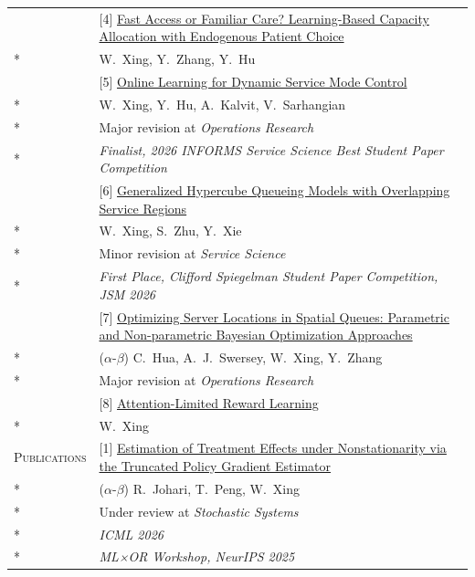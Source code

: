 \documentclass[letterpaper, 10pt]{article}
\newcommand{\cvsection}[1]{\nohyphens{\scshape #1}}
\newlength{\entrysep}   \setlength{\entrysep}{5pt}
\newlength{\sectionsep} \setlength{\sectionsep}{12pt}
\begin{document}
\begin{longtable}{p{}p{5.8in}}
& [4] \href{https://papers.ssrn.com/sol3/papers.cfm?abstract_id=7246479}{Fast Access or Familiar Care? Learning-Based Capacity Allocation with Endogenous Patient Choice} \\*
& W.~Xing, Y.~Zhang, Y.~Hu \\[\entrysep]

& [5] \href{https://papers.ssrn.com/sol3/papers.cfm?abstract_id=5123355}{Online Learning for Dynamic Service Mode Control} \\*
& W.~Xing, Y.~Hu, A.~Kalvit, V.~Sarhangian \\*
& Major revision at \textit{Operations Research} \\*
& \textit{Finalist, 2026 INFORMS Service Science Best Student Paper Competition} \\[\entrysep]

& [6] \href{https://arxiv.org/abs/2304.02824}{Generalized Hypercube Queueing Models with Overlapping Service Regions} \\*
& W.~Xing, S.~Zhu, Y.~Xie \\*
& Minor revision at \textit{Service Science} \\*
& \textit{First Place, Clifford Spiegelman Student Paper Competition, JSM 2026} \\[\entrysep]

& [7] \href{https://arxiv.org/abs/2505.22249}{Optimizing Server Locations in Spatial Queues: Parametric and Non-parametric Bayesian Optimization Approaches} \\*
& ($\alpha$-$\beta$) C.~Hua, A.~J.~Swersey, W.~Xing, Y.~Zhang \\*
& Major revision at \textit{Operations Research} \\[\entrysep]

& [8] \href{https://arxiv.org/abs/2607.04590}{Attention-Limited Reward Learning} \\*
& W.~Xing \\[\sectionsep]


\cvsection{Publications}
& [1] \href{https://arxiv.org/abs/2506.05308}{Estimation of Treatment Effects under Nonstationarity via the Truncated Policy Gradient Estimator} \\*
& ($\alpha$-$\beta$) R.~Johari, T.~Peng, W.~Xing \\*
& Under review at \textit{Stochastic Systems} \\*
& \textit{ICML 2026} \\*
& \textit{ML×OR Workshop, NeurIPS 2025} \\[\entrysep]


\end{longtable}
\end{document}
